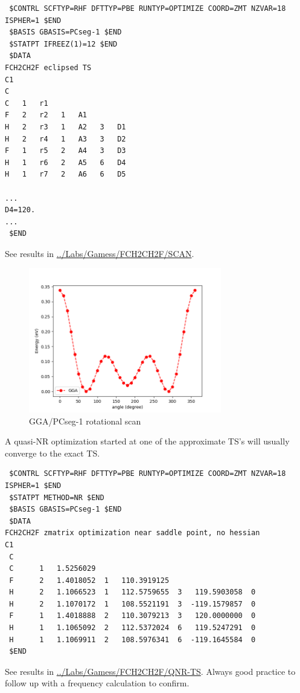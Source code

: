 \documentclass[11pt]{article}
\begin{document}
\begin{verbatim}
 $CONTRL SCFTYP=RHF DFTTYP=PBE RUNTYP=OPTIMIZE COORD=ZMT NZVAR=18 ISPHER=1 $END
 $BASIS GBASIS=PCseg-1 $END
 $STATPT IFREEZ(1)=12 $END
 $DATA
FCH2CH2F eclipsed TS
C1
C
C   1   r1
F   2   r2   1   A1
H   2   r3   1   A2   3   D1
H   2   r4   1   A3   3   D2
F   1   r5   2   A4   3   D3
H   1   r6   2   A5   6   D4
H   1   r7   2   A6   6   D5

...
D4=120.
...
 $END
\end{verbatim}

See results in \href{../Labs/Gamess/FCH2CH2F/SCAN}{../Labs/Gamess/FCH2CH2F/SCAN}.

\begin{figure}[htbp]
\centering
\includegraphics[width=0.75\textwidth]{./Images/FCH2CH2F-scan.png}
\caption{GGA/PCseg-1 rotational scan}
\end{figure}

A quasi-NR optimization started at one of the approximate TS's will usually converge to the exact TS.  
\begin{verbatim}
 $CONTRL SCFTYP=RHF DFTTYP=PBE RUNTYP=OPTIMIZE COORD=ZMT NZVAR=18 ISPHER=1 $END
 $STATPT METHOD=NR $END
 $BASIS GBASIS=PCseg-1 $END
 $DATA
FCH2CH2F zmatrix optimization near saddle point, no hessian
C1
 C   
 C      1   1.5256029
 F      2   1.4018052  1   110.3919125
 H      2   1.1066523  1   112.5759655  3   119.5903058  0
 H      2   1.1070172  1   108.5521191  3  -119.1579857  0
 F      1   1.4018888  2   110.3079213  3   120.0000000  0
 H      1   1.1065092  2   112.5372024  6   119.5247291  0
 H      1   1.1069911  2   108.5976341  6  -119.1645584  0
 $END
\end{verbatim}


See results in \href{../Labs/Gamess/FCH2CH2F/QNR-TS}{../Labs/Gamess/FCH2CH2F/QNR-TS}.  Always good practice to follow up with a frequency calculation to confirm.  
\end{document}
